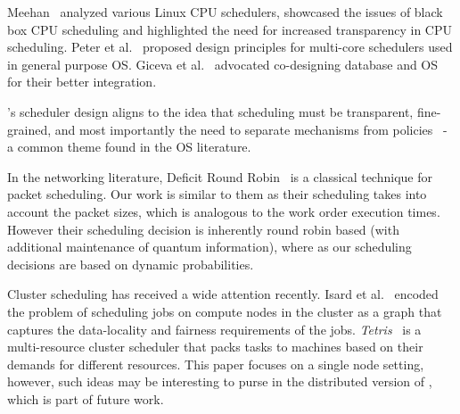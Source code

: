 Meehan~\cite{meehean2011towards} analyzed various Linux CPU schedulers, %
showcased the issues of black box CPU scheduling and highlighted the need for increased transparency in CPU scheduling.
Peter et al.~\cite{peter2010design} proposed design principles for multi-core schedulers used in general purpose OS.
Giceva et al.~\cite{giceva2013cod} advocated co-designing database and OS for their better integration.

\sys{}'s scheduler design aligns to the idea that scheduling must be transparent, fine-grained, and most importantly the need to separate mechanisms from policies~\cite{LampsonS76} - a common theme found in the OS literature.

In the networking literature, Deficit Round Robin~\cite{shreedhar1996efficient} is a classical technique for packet scheduling. 
Our work is similar to them as their scheduling takes into account the packet sizes, which is analogous to the work order execution times.
However their scheduling decision is inherently round robin based (with additional maintenance of quantum information), where as our scheduling decisions are based on dynamic probabilities. 

Cluster scheduling has received a wide attention recently.
Isard et al.~\cite{isard2009quincy} encoded the problem of scheduling jobs on compute nodes in the cluster as a graph that captures the data-locality and fairness requirements of the jobs. 
\textit{Tetris}~\cite{grandl2014multi} is a multi-resource cluster scheduler that packs tasks to machines based on their demands for different resources. 
This paper focuses on a single node setting, however, such ideas may be interesting to purse in the distributed version of \sys{}, which is part of future work.
